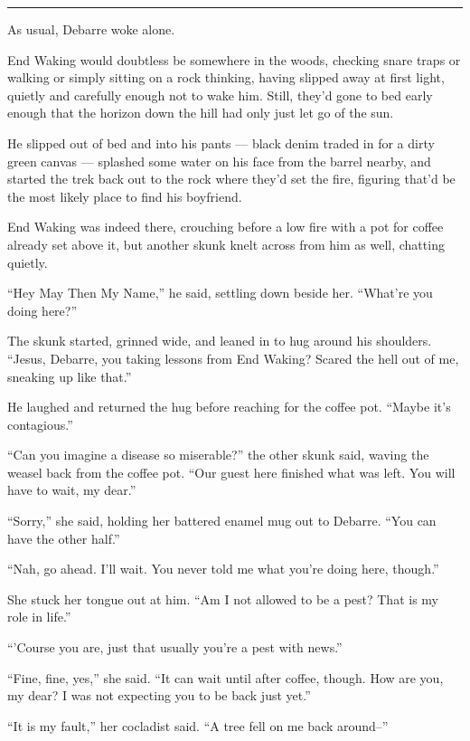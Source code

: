 \begin{center}\rule{0.5\linewidth}{0.5pt}\end{center}

As usual, Debarre woke alone.

End Waking would doubtless be somewhere in the woods, checking snare traps or walking or simply sitting on a rock thinking, having slipped away at first light, quietly and carefully enough not to wake him. Still, they'd gone to bed early enough that the horizon down the hill had only just let go of the sun.

He slipped out of bed and into his pants — black denim traded in for a dirty green canvas — splashed some water on his face from the barrel nearby, and started the trek back out to the rock where they'd set the fire, figuring that'd be the most likely place to find his boyfriend.

End Waking was indeed there, crouching before a low fire with a pot for coffee already set above it, but another skunk knelt across from him as well, chatting quietly.

``Hey May Then My Name,'' he said, settling down beside her. ``What're you doing here?''

The skunk started, grinned wide, and leaned in to hug around his shoulders. ``Jesus, Debarre, you taking lessons from End Waking? Scared the hell out of me, sneaking up like that.''

He laughed and returned the hug before reaching for the coffee pot. ``Maybe it's contagious.''

``Can you imagine a disease so miserable?'' the other skunk said, waving the weasel back from the coffee pot. ``Our guest here finished what was left. You will have to wait, my dear.''

``Sorry,'' she said, holding her battered enamel mug out to Debarre. ``You can have the other half.''

``Nah, go ahead. I'll wait. You never told me what you're doing here, though.''

She stuck her tongue out at him. ``Am I not allowed to be a pest? That is my role in life.''

``'Course you are, just that usually you're a pest with news.''

``Fine, fine, yes,'' she said. ``It can wait until after coffee, though. How are you, my dear? I was not expecting you to be back just yet.''

``It is my fault,'' her cocladist said. ``A tree fell on me back around--''

